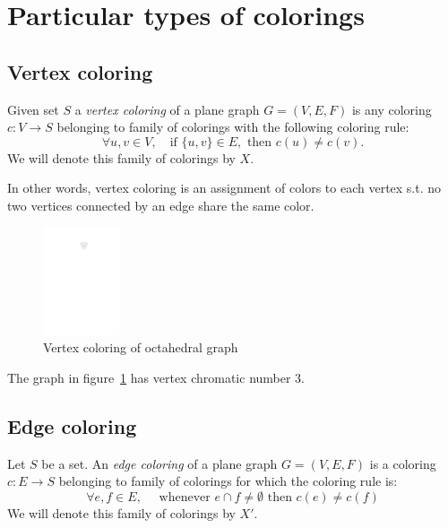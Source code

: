 \section{Particular types of colorings}

\subsection{Vertex coloring}

\begin{definition}
    Given set $S$ a \textit{vertex coloring} of a plane graph $G=(V,E,F)$ is any coloring $c : V \rightarrow S$ belonging to family of colorings with the following coloring rule:
    \begin{equation}\label{eqn:vtx_rule}
        \forall u,v \in V, \quad \text{if } \{u,v\} \in E, \text{ then } c(u) \neq c(v). 
        \tag{$R_V$}
    \end{equation}
    We will denote this family of colorings by $X$.
\end{definition}

In other words, vertex coloring is an assignment of colors to each vertex s.t. no two vertices connected by an edge share the same color.

\begin{figure}[H]
    \centering
    \includegraphics[width=0.2\textwidth]{../Resources/Figs/octahedral_vtx_colr.pdf}
    \caption{Vertex coloring of octahedral graph}
    \label{fig:octahedral_vtx_coloring}
\end{figure}

The graph in figure~\ref{fig:octahedral_vtx_coloring} has vertex chromatic number 3.

\subsection{Edge coloring}

\begin{definition}
    Let $S$ be a set. An \textit{edge coloring} of a plane graph $G=(V,E,F)$ is a coloring $c: E \rightarrow S$ belonging to family of colorings for which the coloring rule is: 
    \begin{equation}\label{eqn:edge_rule}
     \forall e,f \in E, \quad \text{ whenever } e \cap f \neq \emptyset \text{ then } c(e) \neq c(f) \tag{$R_E$}
    \end{equation}
    We will denote this family of colorings by $X'$.
   
\end{definition}

